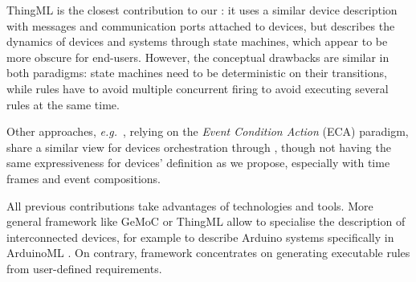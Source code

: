 ThingML \cite{harrand-16} is the closest contribution to our \DSL: it uses a similar device description with messages and communication ports attached to devices, but describes the dynamics of devices and systems through state machines, which appear to be more obscure for end-users. However, the conceptual drawbacks are similar in both paradigms: state machines need to be deterministic on their transitions, while rules have to avoid multiple concurrent firing to avoid executing several rules at the same time. 

Other approaches, \textit{e.g.}~\cite{cheng-16,bhandari-13}, relying on the \textit{Event Condition Action} (ECA) paradigm, share a similar view for \IOT devices orchestration through \CEP, though not having the same expressiveness for devices' definition as we propose, especially with time frames and event compositions.

All previous contributions take advantages of \MDE technologies and tools. More general \MDE framework like GeMoC \cite{bousse-16} or ThingML allow to specialise the description of interconnected devices, for example to describe Arduino systems specifically in ArduinoML \cite{mosser-14}. On contrary, \IOTDSL framework concentrates on generating executable rules from user-defined requirements.